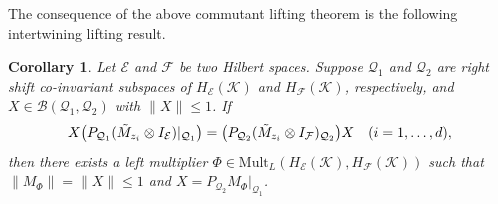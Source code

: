\documentclass[12pt]{amsart}%
\newtheorem{corollary}[theorem]{Corollary}
\numberwithin{equation}{section}
\newcommand{\clb}{\mathcal{B}}
\newcommand{\cle}{\mathcal{E}}
\newcommand{\clf}{\mathcal{F}}
\newcommand{\clk}{\mathcal{K}}
\newcommand{\clq}{\mathcal{Q}}
\begin{document}
The consequence of the above commutant lifting theorem is the following intertwining lifting result.

\begin{corollary}\label{intertwining_lifting}
Let $\cle$ and $\clf$ be two Hilbert spaces. Suppose $\clq_1$ and $\clq_2$ are right shift co-invariant subspaces of $H_\cle(\clk)$ and $H_\clf(\clk)$, respectively, and $X\in \clb(\clq_1, \clq_2)$ with $\|X\|\leq 1$. If
\[X \big (P_{\clq_1} (\Tilde{M}_{z_i} \otimes I_{\cle})|_{\clq_1}\big)= \big(P_{\clq_2}(\Tilde{M}_{z_i} \otimes I_{\clf})_{\clq_2}\big) X \quad (i=1, \ldots, d),\]
then there exists a left multiplier $\Phi\in \text{Mult}_L(H_\cle(\clk), H_\clf(\clk))$ such that $\|M_\Phi\|=\|X\|\leq 1$ and $X=P_{\clq_2} M_\Phi|_{\clq_1}$.
\end{corollary}
\end{document}
